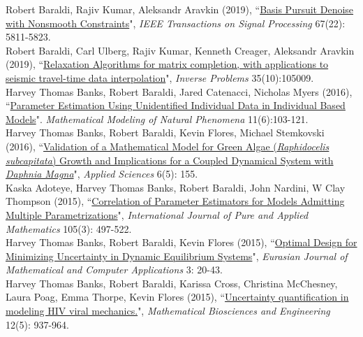 \documentclass[11pt, a4paper]{article}
\newcommand{\years}[1]{\marginnote{#1}}
\begin{document}
\years{2019} Robert Baraldi, Rajiv Kumar, Aleksandr Aravkin  (2019), “\href{https://ieeexplore.ieee.org/document/8861392}{Basis Pursuit Denoise with Nonsmooth Constraints}", \emph{IEEE Transactions on Signal Processing} 67(22): 5811-5823.\\
\years{2019} Robert Baraldi, Carl Ulberg, Rajiv Kumar, Kenneth Creager, Aleksandr Aravkin (2019), “\href{https://iopscience.iop.org/article/10.1088/1361-6420/ab3204}{Relaxation Algorithms for matrix completion, with applications to seismic travel-time data interpolation}", \emph{Inverse Problems} 35(10):105009. \\
\years{2016} Harvey Thomas Banks, Robert Baraldi, Jared Catenacci, Nicholas Myers (2016), “\href{https://www.ncsu.edu/crsc/reports/ftp/pdf/crsc-tr16-04.pdf}{Parameter Estimation Using Unidentified Individual Data in Individual Based Models}". \emph{Mathematical Modeling of Natural Phenomena} 11(6):103-121.\\
\years{2016} Harvey Thomas Banks, Robert Baraldi, Kevin Flores, Michael Stemkovski (2016), “\href{http://www.mdpi.com/2076-3417/6/5/155/htm}{Validation of a Mathematical Model for Green Algae (\emph{Raphidocelis subcapitata}) Growth and Implications for a Coupled Dynamical System with \emph{Daphnia Magna}}", \emph{Applied Sciences} 6(5): 155.\\
\years{2015}Kaska Adoteye, Harvey Thomas Banks, Robert Baraldi, John Nardini, W Clay Thompson (2015), “\href{http://www.ijpam.eu/contents/2015-105-3/16/16.pdf}{Correlation of Parameter Estimators for Models Admitting Multiple Parametrizations}", \emph{International Journal of Pure and Applied Mathematics} 105(3): 497-522.\\
\years{2015}Harvey Thomas Banks, Robert Baraldi, Kevin Flores (2015), “\href{http://www.ncsu.edu/crsc/reports/ftp/pdf/crsc-tr15-03.pdf}{Optimal Design for Minimizing Uncertainty in Dynamic Equilibrium Systems}", \emph{Eurasian Journal of Mathematical and Computer Applications} 3: 20-43.\\
\years{2015}Harvey Thomas Banks, Robert Baraldi, Karissa Cross, Christina McChesney, Laura Poag, Emma Thorpe, Kevin Flores (2015), “\href{http://aimsciences.org/journals/displayArticlesnew.jsp?paperID=11300}{Uncertainty quantification in modeling HIV viral mechanics.}", \emph{Mathematical Biosciences and Engineering} 12(5): 937-964.\\
\end{document}

